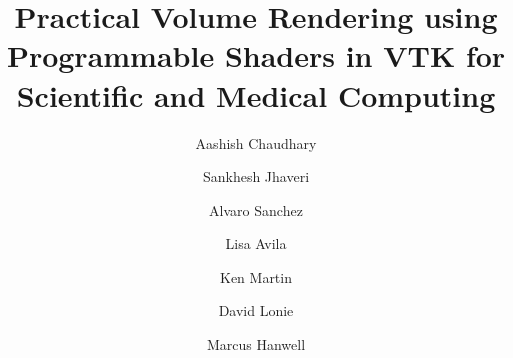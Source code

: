 \title{Practical Volume Rendering using Programmable Shaders in VTK for Scientific and Medical Computing}

\author{Aashish Chaudhary}

\author{Sankhesh Jhaveri}

\author{Alvaro Sanchez\corref{}}

\author{Lisa Avila}

\author{Ken Martin}

\author{David Lonie}

\author{Marcus Hanwell}

\address{Kitware, Inc., 28 Corporate Drive, Clifton Park, NY 12065, USA}
